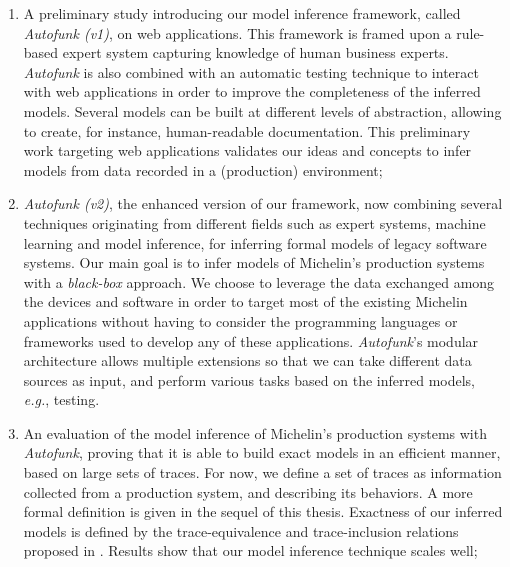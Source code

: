 \begin{enumerate}
    \item A preliminary study introducing our model inference
        framework, called \emph{Autofunk (v1)}, on web
        applications. This framework is framed upon a rule-based
        expert system capturing knowledge of human business
        experts. \textit{Autofunk} is also combined with an
        automatic testing technique to interact with web
        applications in order to improve the completeness of the
        inferred models.  Several models can be built at
        different levels of abstraction, allowing to create, for
        instance, human-readable documentation. This preliminary
        work targeting web applications validates our ideas and
        concepts to infer models from data recorded in a
        (production) environment;

    \item \textit{Autofunk (v2)}, the enhanced version of our
        framework, now combining several techniques originating
        from different fields such as expert systems, machine
        learning and model inference, for inferring formal models
        of legacy software systems. Our main goal is to infer
        models of Michelin's production systems with a
        \emph{black-box} approach. We choose to leverage the data
        exchanged among the devices and software in order to
        target most of the existing Michelin applications without
        having to consider the programming languages or
        frameworks used to develop any of these applications.
        \textit{Autofunk}'s modular architecture allows multiple
        extensions so that we can take different data sources as
        input, and perform various tasks based on the inferred
        models, \emph{e.g.}, testing.

    \item An evaluation of the model inference of Michelin's
        production systems with \textit{Autofunk}, proving that
        it is able to build exact models in an efficient manner,
        based on large sets of traces. For now, we define a set
        of traces as information collected from a production
        system, and describing its behaviors. A more formal
        definition is given in the sequel of this thesis.
        Exactness of our inferred models is defined by the
        trace-equivalence and trace-inclusion relations proposed
        in \cite{petrenko06}. Results show that our model
        inference technique scales well;


\end{enumerate}
